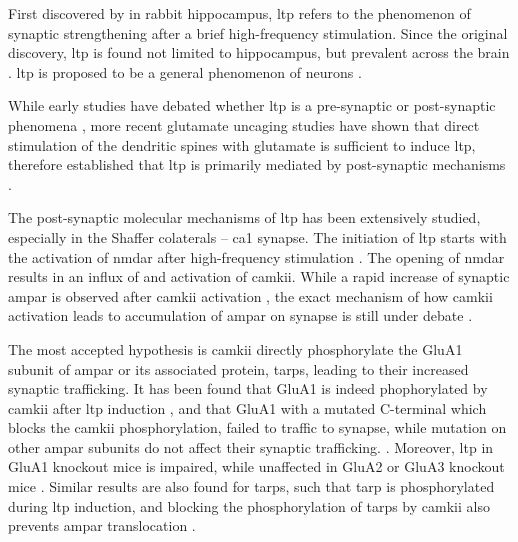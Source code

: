 First discovered by \citet{bliss73} in rabbit hippocampus, \gls{ltp} refers to the phenomenon of synaptic strengthening after a brief high-frequency stimulation. Since the original discovery, \gls{ltp} is found not limited to hippocampus, but prevalent across the brain \citep[e.g.][]{clugnet90}. \gls{ltp} is proposed to be a general phenomenon of neurons \citep{malenka04}. 

While early studies have debated whether \gls{ltp} is a pre-synaptic or post-synaptic phenomena \citep{malinow90, bekkers90, isaac95, liao95}, more recent glutamate uncaging studies have shown that direct stimulation of the dendritic spines with glutamate is sufficient to induce \gls{ltp}, therefore established that \gls{ltp} is primarily mediated by post-synaptic mechanisms \citep{kerchner08}. 

The post-synaptic molecular mechanisms of \gls{ltp} has been extensively studied, especially in the Shaffer colaterals -- \gls{ca1} synapse. The initiation of \gls{ltp} starts with the activation of \gls{nmdar} after high-frequency stimulation \citep{collingridge83}. The opening of \gls{nmdar} results in an influx of  and activation of \gls{camkii}. While a rapid increase of synaptic \gls{ampar} is observed after \gls{camkii} activation \citep{patterson10}, the exact mechanism of how \gls{camkii} activation leads to accumulation of \gls{ampar} on synapse is still under debate \citep{herring16}. 

The most accepted hypothesis is \gls{camkii} directly phosphorylate the GluA1 subunit of \gls{ampar} or its associated protein, \glspl{tarp}, leading to their increased synaptic trafficking. It has been found that GluA1 is indeed phophorylated by \gls{camkii} after \gls{ltp} induction \citep{mcglade-mcculloh93, barria97, lee03}, and that GluA1 with a mutated C-terminal which blocks the \gls{camkii} phosphorylation, failed to traffic to synapse, while mutation on other \gls{ampar} subunits do not affect their synaptic trafficking. \citep{hayashi00, shi01}. Moreover, \gls{ltp} in GluA1 knockout mice is impaired, while unaffected in GluA2 or GluA3 knockout mice \citep{zamanillo99, meng03}. Similar results are also found for \glspl{tarp}, such that \gls{tarp} is phosphorylated during \gls{ltp} induction, and blocking the phosphorylation of \glspl{tarp} by \gls{camkii} also prevents \gls{ampar} translocation \citep{tomita05, sumioka10}.

